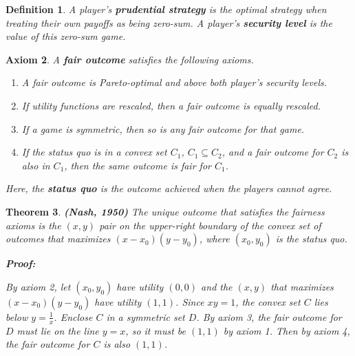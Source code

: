 \documentclass{article}
\theoremstyle{colontheorem}
\newtheorem{theorem}{Theorem}[section]
\newtheorem{definition}[theorem]{Definition}
\newtheorem{axiom}[theorem]{Axiom}
\newenvironment{Theorem}
{
	\begin{mdframed}[backgroundcolor=TheoremOrange!10]
	\begin{theorem}
}
{
	\end{theorem}
	\end{mdframed}
	
	\vspace{.15in}
}
\newenvironment{Def}
{
	\begin{mdframed}[backgroundcolor=DefGreen!10]
	\begin{definition}
}
{
	\end{definition}
	\end{mdframed}
	
	\vspace{.15in}
}
\newenvironment{Axiom}
{
	\begin{mdframed}[backgroundcolor=AxiomRed!10]
	\begin{axiom}
}
{
	\end{axiom}
	\end{mdframed}
	
	\vspace{.15in}
}
\newenvironment{Proof}
{
	\begin{mdframed}[backgroundcolor=ProofPurple!10]
	\textbf{Proof:}%
}
{
	\end{mdframed}
	
	\vspace{.085in}
}
\begin{document}
\begin{Def}
	
	A player's \textbf{prudential strategy} is the optimal strategy when treating their own payoffs as being zero-sum. A player's \textbf{security level} is the value of this zero-sum game.
	
\end{Def}



\begin{Axiom}
	
	A \textbf{fair outcome} satisfies the following axioms.
	
	\begin{enumerate}
		
		\item A fair outcome is Pareto-optimal and above both player's security levels.
		
		\item If utility functions are rescaled, then a fair outcome is equally rescaled.
		
		\item If a game is symmetric, then so is any fair outcome for that game.
		
		\item If the status quo is in a convex set $C_1$, $C_1 \subseteq C_2$, and a fair outcome for $C_2$ is also in $C_1$, then the same outcome is fair for $C_1$.
		
	\end{enumerate}
	
	Here, the \textbf{status quo} is the outcome achieved when the players cannot agree.
	
\end{Axiom}



\begin{Theorem}
	
	\textbf{(Nash, 1950)} The unique outcome that satisfies the fairness axioms is the $(x, y)$ pair on the upper-right boundary of the convex set of outcomes that maximizes $(x - x_0)(y - y_0)$, where $(x_0, y_0)$ is the status quo.
	
	\begin{Proof}
		By axiom 2, let $(x_0, y_0)$ have utility $(0, 0)$ and the $(x, y)$ that maximizes $(x - x_0)(y - y_0)$ have utility $(1, 1)$. Since $xy = 1$, the convex set $C$ lies below $y = \frac{1}{x}$. Enclose $C$ in a symmetric set $D$. By axiom 3, the fair outcome for $D$ must lie on the line $y = x$, so it must be $(1, 1)$ by axiom 1. Then by axiom 4, the fair outcome for $C$ is also $(1, 1)$.
		
	\end{Proof}
	
\end{Theorem}
\end{document}
